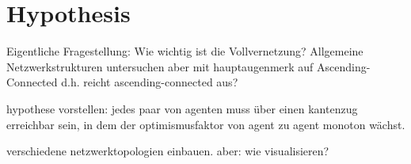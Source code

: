 \documentclass[Bachelorarbeit.tex]{subfiles}
\begin{document}
\chapter{Hypothesis}
Eigentliche Fragestellung: Wie wichtig ist die Vollvernetzung?
	Allgemeine Netzwerkstrukturen untersuchen aber mit hauptaugenmerk auf Ascending-Connected d.h. reicht ascending-connected aus?

hypothese vorstellen: jedes paar von agenten muss über einen kantenzug erreichbar sein, in dem der optimismusfaktor von agent zu agent monoton wächst.

verschiedene netzwerktopologien einbauen. aber: wie visualisieren?
\end{document}
